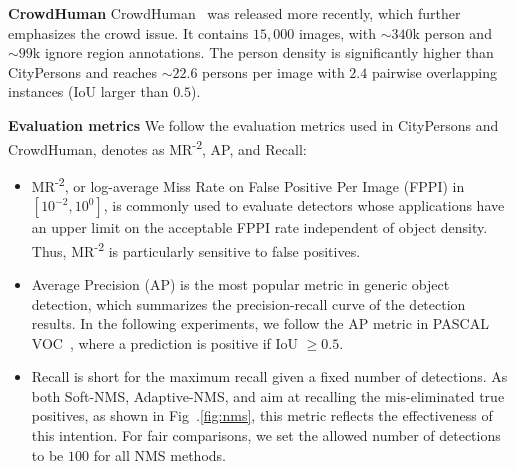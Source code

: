 \documentclass[sigconf]{acmart}
\begin{document}
\textbf{CrowdHuman} CrowdHuman~\cite{crowdhuman} was released more recently, which further emphasizes the crowd issue. It contains $15,000$ images, with $\sim340$k person and $\sim99$k ignore region annotations. The person density is significantly higher than CityPersons and reaches $\sim22.6$ persons per image with $2.4$ pairwise overlapping instances (IoU larger than $0.5$).

\textbf{Evaluation metrics} We follow the evaluation metrics used in CityPersons and CrowdHuman, denotes as MR\textsuperscript{-2}, AP, and Recall:
\begin{itemize}
    \item MR\textsuperscript{-2}, or log-average Miss Rate on False Positive Per Image (FPPI) in $[10^{-2}, 10^0]$, is commonly used to evaluate detectors whose applications have an upper limit on the acceptable FPPI rate independent of object density. Thus, MR\textsuperscript{-2} is particularly sensitive to false positives. 
    \item Average Precision (AP) is the most popular metric in generic object detection, which summarizes the precision-recall curve of the detection results. In the following experiments, we follow the AP metric in PASCAL VOC~\cite{pascal}, where a prediction is positive if IoU $\geq 0.5$.
    \item Recall is short for the maximum recall given a fixed number of detections. As both Soft-NMS, Adaptive-NMS, and \nmsname{} aim at recalling the mis-eliminated true positives, as shown in Fig~.\ref{fig:nms}, this metric reflects the effectiveness of this intention. For fair comparisons, we set the allowed number of detections to be $100$ for all NMS methods.
\end{itemize}
\end{document}
